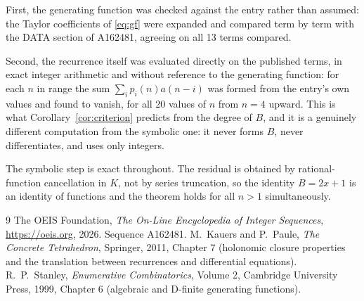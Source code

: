 \documentclass[11pt,a4paper]{article}
\theoremstyle{plain}
\theoremstyle{definition}
\begin{document}
First, the generating function was checked against the entry rather than assumed: the
Taylor coefficients of \eqref{eq:gf} were expanded and compared term by term with the DATA
section of A162481, agreeing on all 13 terms compared.

Second, the recurrence itself was evaluated directly on the published terms, in exact
integer arithmetic and without reference to the generating function: for each $n$ in range
the sum $\sum_{i}p_{i}(n)a(n-i)$ was formed from the entry's own values and found to
vanish, for all 20 values of $n$ from $n=4$ upward. This is what
Corollary~\ref{cor:criterion} predicts from the degree of $B$, and it is a genuinely
different computation from the symbolic one: it never forms $B$, never differentiates, and
uses only integers.

The symbolic step is exact throughout. The residual is obtained by rational-function
cancellation in $K$, not by series truncation, so the identity $B=2 x + 1$ is an
identity of functions and the theorem holds for all $n>1$ simultaneously.

\begin{thebibliography}{9}
 The OEIS Foundation, \emph{The On-Line Encyclopedia of Integer Sequences},
\url{https://oeis.org}, 2026. Sequence A162481.
 M.~Kauers and P.~Paule, \emph{The Concrete Tetrahedron}, Springer, 2011,
Chapter 7 (holonomic closure properties and the translation between recurrences and
differential equations).
 R.~P.~Stanley, \emph{Enumerative Combinatorics}, Volume 2, Cambridge
University Press, 1999, Chapter 6 (algebraic and D-finite generating functions).
\end{thebibliography}
\end{document}
